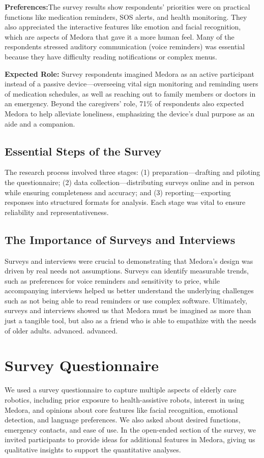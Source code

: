 \textbf{Preferences:}The survey results show respondents’ priorities were on practical functions like medication reminders, SOS alerts, and health monitoring. They also appreciated the interactive features like emotion and facial recognition, which are aspects of Medora that gave it a more human feel. Many of the respondents stressed auditory communication (voice reminders) was essential because they have difficulty reading notifications or complex menus.

\textbf{Expected Role:} Survey respondents imagined Medora as an active participant instead of a passive device—overseeing vital sign monitoring and reminding users of medication schedules, as well as reaching out to family members or doctors in an emergency. Beyond the caregivers’ role, 71\% of respondents also expected Medora to help alleviate loneliness, emphasizing the device’s dual purpose as an aide and a companion.



\subsection{Essential Steps of the Survey}

The research process involved three stages: (1) preparation—drafting and piloting the questionnaire; (2) data collection—distributing surveys online and in person while ensuring completeness and accuracy; and (3) reporting—exporting responses into structured formats  for analysis. Each stage was vital to ensure reliability and representativeness.

\subsection{The Importance of Surveys and Interviews}

Surveys and interviews were crucial to demonstrating that Medora’s design was driven by real needs not assumptions. Surveys can identify measurable trends, such as preferences for voice reminders and sensitivity to price, while accompanying interviews helped us better understand the underlying challenges such as not being able to read reminders or use complex software. Ultimately, surveys and interviews showed us that Medora must be imagined as more than just a tangible tool, but also as a friend who is able to empathize with the needs of older adults.
 advanced. advanced.

\section{Survey Questionnaire}
We used a survey questionnaire to capture multiple aspects of elderly care robotics, including prior exposure to health-assistive robots, interest in using Medora, and opinions about core features like facial recognition, emotional detection, and language preferences. We also asked about desired functions, emergency contacts, and ease of use. In the open-ended section of the survey, we invited participants to provide ideas for additional features in Medora, giving us qualitative insights to support the quantitative analyses.

